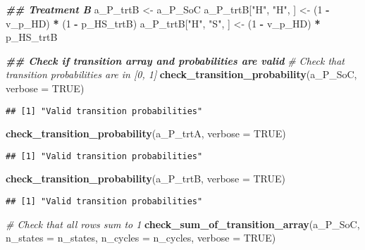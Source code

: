 \documentclass[
]{article}
\newenvironment{Shaded}{\begin{snugshade}}{\end{snugshade}}
\newcommand{\AttributeTok}[1]{\textcolor[rgb]{0.13,0.29,0.53}{#1}}
\newcommand{\CommentTok}[1]{\textcolor[rgb]{0.56,0.35,0.01}{\textit{#1}}}
\newcommand{\ConstantTok}[1]{\textcolor[rgb]{0.56,0.35,0.01}{#1}}
\newcommand{\DecValTok}[1]{\textcolor[rgb]{0.00,0.00,0.81}{#1}}
\newcommand{\DocumentationTok}[1]{\textcolor[rgb]{0.56,0.35,0.01}{\textbf{\textit{#1}}}}
\newcommand{\FunctionTok}[1]{\textcolor[rgb]{0.13,0.29,0.53}{\textbf{#1}}}
\newcommand{\NormalTok}[1]{#1}
\newcommand{\OtherTok}[1]{\textcolor[rgb]{0.56,0.35,0.01}{#1}}
\newcommand{\SpecialCharTok}[1]{\textcolor[rgb]{0.81,0.36,0.00}{\textbf{#1}}}
\newcommand{\StringTok}[1]{\textcolor[rgb]{0.31,0.60,0.02}{#1}}
\begin{document}
\begin{Shaded}
\begin{Highlighting}[]
\DocumentationTok{\#\# Treatment B}
\NormalTok{a\_P\_trtB }\OtherTok{\textless{}{-}}\NormalTok{ a\_P\_SoC}
\NormalTok{a\_P\_trtB[}\StringTok{"H"}\NormalTok{, }\StringTok{"H"}\NormalTok{, ] }\OtherTok{\textless{}{-}}\NormalTok{ (}\DecValTok{1} \SpecialCharTok{{-}}\NormalTok{ v\_p\_HD) }\SpecialCharTok{*}\NormalTok{ (}\DecValTok{1} \SpecialCharTok{{-}}\NormalTok{ p\_HS\_trtB)}
\NormalTok{a\_P\_trtB[}\StringTok{"H"}\NormalTok{, }\StringTok{"S"}\NormalTok{, ] }\OtherTok{\textless{}{-}}\NormalTok{ (}\DecValTok{1} \SpecialCharTok{{-}}\NormalTok{ v\_p\_HD) }\SpecialCharTok{*}\NormalTok{      p\_HS\_trtB}

\DocumentationTok{\#\# Check if transition array and probabilities are valid}
\CommentTok{\# Check that transition probabilities are in [0, 1]}
\FunctionTok{check\_transition\_probability}\NormalTok{(a\_P\_SoC,  }\AttributeTok{verbose =} \ConstantTok{TRUE}\NormalTok{)}
\end{Highlighting}
\end{Shaded}

\begin{verbatim}
## [1] "Valid transition probabilities"
\end{verbatim}

\begin{Shaded}
\begin{Highlighting}[]
\FunctionTok{check\_transition\_probability}\NormalTok{(a\_P\_trtA, }\AttributeTok{verbose =} \ConstantTok{TRUE}\NormalTok{)}
\end{Highlighting}
\end{Shaded}

\begin{verbatim}
## [1] "Valid transition probabilities"
\end{verbatim}

\begin{Shaded}
\begin{Highlighting}[]
\FunctionTok{check\_transition\_probability}\NormalTok{(a\_P\_trtB, }\AttributeTok{verbose =} \ConstantTok{TRUE}\NormalTok{)}
\end{Highlighting}
\end{Shaded}

\begin{verbatim}
## [1] "Valid transition probabilities"
\end{verbatim}

\begin{Shaded}
\begin{Highlighting}[]
\CommentTok{\# Check that all rows sum to 1}
\FunctionTok{check\_sum\_of\_transition\_array}\NormalTok{(a\_P\_SoC,  }\AttributeTok{n\_states =}\NormalTok{ n\_states, }\AttributeTok{n\_cycles =}\NormalTok{ n\_cycles, }\AttributeTok{verbose =} \ConstantTok{TRUE}\NormalTok{)}
\end{Highlighting}
\end{Shaded}
\end{document}
